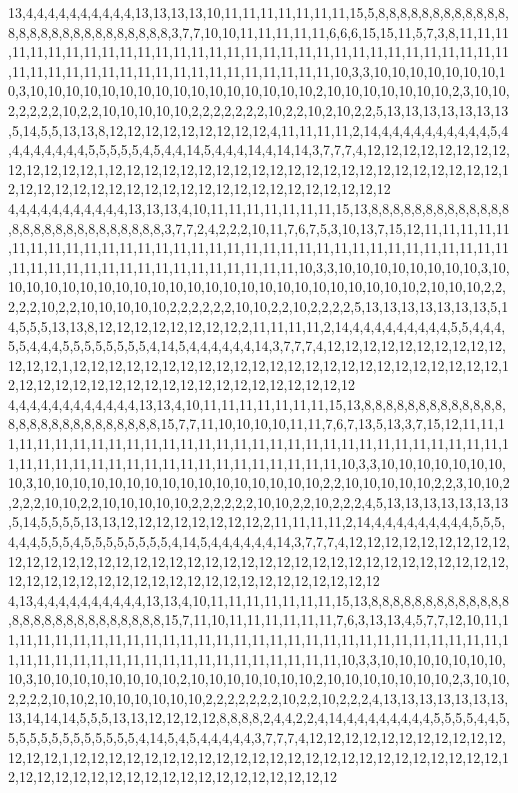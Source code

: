 13,4,4,4,4,4,4,4,4,4,4,13,13,13,13,10,11,11,11,11,11,11,11,15,5,8,8,8,8,8,8,8,8,8,8,8,8,8,8,8,8,8,8,8,8,8,8,8,8,8,8,8,3,7,7,10,10,11,11,11,11,11,6,6,6,15,15,11,5,7,3,8,11,11,11,11,11,11,11,11,11,11,11,11,11,11,11,11,11,11,11,11,11,11,11,11,11,11,11,11,11,11,11,11,11,11,11,11,11,11,11,11,11,11,11,11,11,11,11,11,11,10,3,3,10,10,10,10,10,10,10,10,3,10,10,10,10,10,10,10,10,10,10,10,10,10,10,10,10,2,10,10,10,10,10,10,10,2,3,10,10,2,2,2,2,2,10,2,2,10,10,10,10,10,2,2,2,2,2,2,2,10,2,2,10,2,10,2,2,5,13,13,13,13,13,13,13,5,14,5,5,13,13,8,12,12,12,12,12,12,12,12,12,4,11,11,11,11,2,14,4,4,4,4,4,4,4,4,4,4,5,4,4,4,4,4,4,4,4,5,5,5,5,5,4,5,4,4,14,5,4,4,4,14,4,14,14,3,7,7,7,4,12,12,12,12,12,12,12,12,12,12,12,12,12,1,12,12,12,12,12,12,12,12,12,12,12,12,12,12,12,12,12,12,12,12,12,12,12,12,12,12,12,12,12,12,12,12,12,12,12,12,12,12,12,12,12,12,12,12
4,4,4,4,4,4,4,4,4,4,4,13,13,13,4,10,11,11,11,11,11,11,11,15,13,8,8,8,8,8,8,8,8,8,8,8,8,8,8,8,8,8,8,8,8,8,8,8,8,8,8,8,3,7,7,2,4,2,2,2,10,11,7,6,7,5,3,10,13,7,15,12,11,11,11,11,11,11,11,11,11,11,11,11,11,11,11,11,11,11,11,11,11,11,11,11,11,11,11,11,11,11,11,11,11,11,11,11,11,11,11,11,11,11,11,11,11,11,11,11,11,10,3,3,10,10,10,10,10,10,10,10,3,10,10,10,10,10,10,10,10,10,10,10,10,10,10,10,10,10,10,10,10,10,10,10,10,2,10,10,10,2,2,2,2,2,10,2,2,10,10,10,10,10,2,2,2,2,2,2,10,10,2,2,10,2,2,2,2,5,13,13,13,13,13,13,13,5,14,5,5,5,13,13,8,12,12,12,12,12,12,12,12,2,11,11,11,11,2,14,4,4,4,4,4,4,4,4,4,5,5,4,4,4,5,5,4,4,4,5,5,5,5,5,5,5,5,4,14,5,4,4,4,4,4,4,14,3,7,7,7,4,12,12,12,12,12,12,12,12,12,12,12,12,12,1,12,12,12,12,12,12,12,12,12,12,12,12,12,12,12,12,12,12,12,12,12,12,12,12,12,12,12,12,12,12,12,12,12,12,12,12,12,12,12,12,12,12,12,12
4,4,4,4,4,4,4,4,4,4,4,4,13,13,4,10,11,11,11,11,11,11,11,15,13,8,8,8,8,8,8,8,8,8,8,8,8,8,8,8,8,8,8,8,8,8,8,8,8,8,8,8,15,7,7,11,10,10,10,10,11,11,7,6,7,13,5,13,3,7,15,12,11,11,11,11,11,11,11,11,11,11,11,11,11,11,11,11,11,11,11,11,11,11,11,11,11,11,11,11,11,11,11,11,11,11,11,11,11,11,11,11,11,11,11,11,11,11,11,11,11,10,3,3,10,10,10,10,10,10,10,10,3,10,10,10,10,10,10,10,10,10,10,10,10,10,10,10,10,2,2,10,10,10,10,10,2,2,3,10,10,2,2,2,2,10,10,2,2,10,10,10,10,10,2,2,2,2,2,2,10,10,2,2,10,2,2,2,4,5,13,13,13,13,13,13,13,5,14,5,5,5,5,13,13,12,12,12,12,12,12,12,12,2,11,11,11,11,2,14,4,4,4,4,4,4,4,4,4,5,5,5,4,4,4,5,5,5,4,5,5,5,5,5,5,5,5,4,14,5,4,4,4,4,4,4,14,3,7,7,7,4,12,12,12,12,12,12,12,12,12,12,12,12,12,12,12,12,12,12,12,12,12,12,12,12,12,12,12,12,12,12,12,12,12,12,12,12,12,12,12,12,12,12,12,12,12,12,12,12,12,12,12,12,12,12,12,12,12,12
4,13,4,4,4,4,4,4,4,4,4,4,13,13,4,10,11,11,11,11,11,11,11,15,13,8,8,8,8,8,8,8,8,8,8,8,8,8,8,8,8,8,8,8,8,8,8,8,8,8,8,8,15,7,11,10,11,11,11,11,11,11,7,6,3,13,13,4,5,7,7,12,10,11,11,11,11,11,11,11,11,11,11,11,11,11,11,11,11,11,11,11,11,11,11,11,11,11,11,11,11,11,11,11,11,11,11,11,11,11,11,11,11,11,11,11,11,11,11,11,11,10,3,3,10,10,10,10,10,10,10,10,3,10,10,10,10,10,10,10,10,2,10,10,10,10,10,10,10,2,10,10,10,10,10,10,10,2,3,10,10,2,2,2,2,10,10,2,10,10,10,10,10,10,2,2,2,2,2,2,2,10,2,2,10,2,2,2,4,13,13,13,13,13,13,13,13,14,14,14,5,5,5,13,13,12,12,12,12,8,8,8,8,2,4,4,2,2,4,14,4,4,4,4,4,4,4,4,5,5,5,5,4,4,5,5,5,5,5,5,5,5,5,5,5,5,5,4,14,5,4,5,4,4,4,4,4,3,7,7,7,4,12,12,12,12,12,12,12,12,12,12,12,12,12,12,1,12,12,12,12,12,12,12,12,12,12,12,12,12,12,12,12,12,12,12,12,12,12,12,12,12,12,12,12,12,12,12,12,12,12,12,12,12,12,12,12,12,12,12
